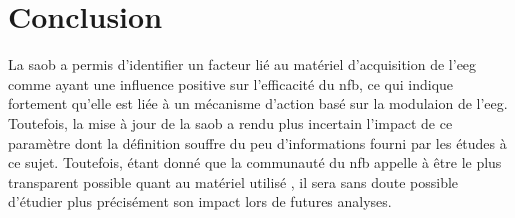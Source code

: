 %
%


\section{Conclusion}

La \gls{saob} a permis d'identifier un facteur lié au matériel d'acquisition de l'\gls{eeg} comme ayant une influence positive sur l'efficacité du \gls{nfb}, 
ce qui indique fortement qu'elle est liée à un mécanisme d'action basé sur la modulaion de l'\gls{eeg}. Toutefois, la mise à jour de la \gls{saob} a rendu
plus incertain l'impact de ce paramètre dont la définition souffre du peu d'informations fourni par les études à ce sujet. Toutefois, étant donné que la
communauté du \gls{nfb} appelle à être le plus transparent possible quant au matériel utilisé \citep{Ros2019}, il sera sans doute possible d'étudier plus précisément
son impact lors de futures analyses.

